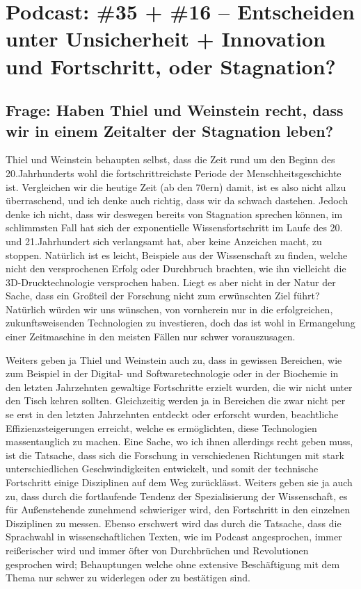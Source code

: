 \documentclass[twoside, a4paper, DIV=11, open=any, bibliography=totoc]{scrbook}
\begin{document}
\section{Podcast: \#35 + \#16 -- Entscheiden unter Unsicherheit +
Innovation und Fortschritt, oder Stagnation?}

\subsection{Frage: Haben Thiel und Weinstein recht, dass wir in einem Zeitalter der Stagnation leben?}

Thiel und Weinstein behaupten selbst, dass die Zeit rund um den Beginn des 20.Jahrhunderts
wohl die fortschrittreichste Periode der Menschheitsgeschichte ist.
Vergleichen wir die heutige Zeit (ab den 70ern) damit, ist es also nicht allzu überraschend,
und ich denke auch richtig, dass wir da schwach dastehen.
Jedoch denke ich nicht, dass wir deswegen bereits von Stagnation sprechen können,
im schlimmsten Fall hat sich der exponentielle Wissensfortschritt im Laufe
des 20. und 21.Jahrhundert sich verlangsamt hat, aber keine Anzeichen macht, zu stoppen.
Natürlich ist es leicht, Beispiele aus der Wissenschaft zu finden, welche nicht
den versprochenen Erfolg oder Durchbruch brachten, wie ihn vielleicht die
3D-Drucktechnologie versprochen haben. Liegt es aber nicht in der Natur der Sache,
dass ein Großteil der Forschung nicht zum erwünschten Ziel führt?
Natürlich würden wir uns wünschen, von vornherein nur in die erfolgreichen, zukunftsweisenden
Technologien zu investieren, doch das ist wohl in Ermangelung einer Zeitmaschine
in den meisten Fällen nur schwer vorauszusagen.


Weiters geben ja Thiel und Weinstein auch zu, dass in gewissen Bereichen, wie
zum Beispiel in der Digital- und Softwaretechnologie oder in der Biochemie
in den letzten Jahrzehnten gewaltige
Fortschritte erzielt wurden, die wir nicht unter den Tisch kehren sollten.
Gleichzeitig werden ja in Bereichen die zwar nicht per se erst in den letzten
Jahrzehnten entdeckt oder erforscht wurden, beachtliche Effizienzsteigerungen erreicht,
welche es ermöglichten, diese Technologien massentauglich zu machen.
Eine Sache, wo ich ihnen allerdings recht geben muss, ist die Tatsache, dass sich die
Forschung in verschiedenen Richtungen mit stark unterschiedlichen Geschwindigkeiten
entwickelt, und somit der technische Fortschritt einige Disziplinen auf dem Weg zurücklässt.
Weiters geben sie ja auch zu, dass durch die fortlaufende Tendenz der Spezialisierung
der Wissenschaft, es für Außenstehende zunehmend schwieriger wird, den Fortschritt
in den einzelnen Disziplinen zu messen. Ebenso erschwert wird das durch die Tatsache,
dass die Sprachwahl in wissenschaftlichen Texten, wie im Podcast angesprochen,
immer reißerischer wird und immer öfter von Durchbrüchen und Revolutionen gesprochen
wird; Behauptungen welche ohne extensive Beschäftigung mit dem Thema nur schwer
zu widerlegen oder zu bestätigen sind.
\end{document}
